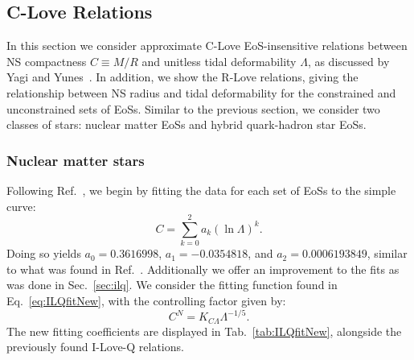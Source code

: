 \documentclass[prd,twocolumn,nofootinbib,superscriptaddress,amsmath,amssymb]{revtex4-1}
\begin{document}
{}

\subsection{C-Love Relations}\label{sec:clove}
In this section we consider approximate C-Love EoS-insensitive relations between NS compactness $C \equiv M/R$ and unitless tidal deformability $\Lambda$, as discussed by Yagi and Yunes~\cite{Yagi:binLove}.
In addition, we show the R-Love relations, giving the relationship between NS radius and tidal deformability for the constrained and unconstrained sets of EoSs.
Similar to the previous section, we consider two classes of stars: nuclear matter EoSs and hybrid quark-hadron star EoSs.

\subsubsection{Nuclear matter stars}\label{sec:clove-nuc}
Following Ref.~\cite{Yagi:binLove}, we begin by fitting the data for each set of EoSs to the simple curve:
\begin{equation}
C = \sum^2_{k=0} a_k (\ln{\Lambda})^k.
\end{equation}
Doing so yields $a_0 = 0.3616998$, $a_1 = -0.0354818$, and $a_2 = 0.0006193849$, similar to what was found in Ref.~\cite{Yagi:binLove}.
Additionally we offer an improvement to the fits as was done in Sec.~\ref{sec:ilq}. 
We consider the fitting function found in Eq.~\ref{eq:ILQfitNew}, with the controlling factor given by:
\begin{equation}
C^N=K_{C\Lambda}\Lambda^{-1/5}.\label{eq:cloveFit}
\end{equation}
The new fitting coefficients are displayed in Tab.~\ref{tab:ILQfitNew}, alongside the previously found I-Love-Q relations.
\end{document}
